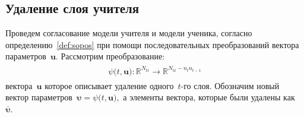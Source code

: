 \documentclass[12pt]{a&t}
\begin{document}
\subsection{Удаление слоя учителя}
Проведем согласование модели учителя и модели ученика, согласно определению~\ref{def:sopos} при помощи последовательных преобразований вектора параметров~$\mathbf{u}$. Рассмотрим преобразование:
\begin{gather}
\label{eq:ap:4}
\begin{aligned}
\psi\bigr(t, \mathbf{u}\bigr) : \mathbb{R}^{N_{\text{tr}}} \to \mathbb{R}^{N_{\text{tr}}-n_tn_{t-1}}
\end{aligned}
\end{gather}
вектора~$\mathbf{u}$ которое описывает удаление одного~$t$-го слоя.
Обозначим новый вектор параметров~$\bm{\upsilon} = \psi\bigr(t, \mathbf{u}\bigr),$ а элементы вектора, которые были удалены как~$\bar{\bm{\upsilon}}.$ 
\end{document}
